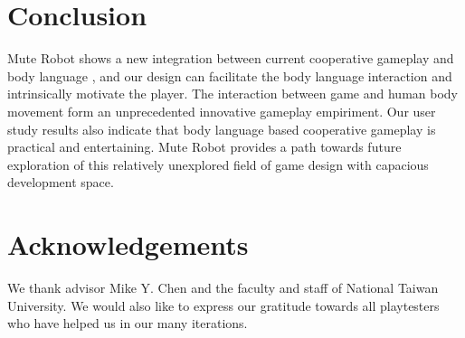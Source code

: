 \documentclass{chi-ext}
\begin{document}
\section{Conclusion}
Mute Robot shows a new integration between current cooperative gameplay and body language
, and our design can facilitate the body language interaction and intrinsically motivate the player.
The interaction between game and human body movement form an unprecedented innovative gameplay empiriment.
Our user study results also indicate that body language based cooperative gameplay is practical and entertaining.
Mute Robot provides a path towards future exploration of this relatively unexplored field of game design with capacious development space.



\section{Acknowledgements}
We thank advisor Mike Y. Chen and the faculty and staff of National Taiwan University.
We would also like to express our gratitude towards all playtesters who have helped us in our many iterations. 



\balance


\end{document}
